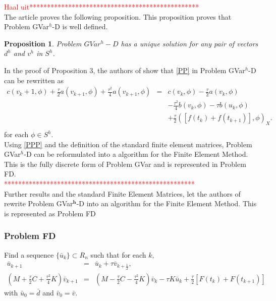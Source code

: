 \documentclass[../../main.tex]{subfiles}
\begin{document}
\textcolor{red}{Haal uit************************************************}\\
The article \cite{BV13} proves the following proposition. This proposition proves that Problem GVar$^h$-D is well defined.

\newtheorem{DC_Prop4}[DC_Prop2]{Proposition}
\begin{DC_Prop4}
	Problem $GVar^{h}-D$ has a unique solution for any pair of vectors $d^{h}$ and $v^{h}$ in $S^{h}$.
\end{DC_Prop4}

In the proof of Proposition 3, the authors of \cite{BV13} show that \eqref{PP} in Problem GVar$^h$-D can be rewritten as
\begin{eqnarray}
	c(v_k+1,\phi) + \frac{\tau}{2} a(v_{k+1},\phi) + \frac{\tau^2}{4} a(v_{k+1},\phi) & = & c(v_k,\phi) - \frac{\tau}{2} a(v_k,\phi) \nonumber \\  &&
	- \frac{\tau^2}{4}b(v_k,\phi) - \tau b(u_k,\phi) \nonumber\\
	&&+\frac{\tau}{2}([f(t_k)+f(t_{k+1})],\phi)_X.\nonumber \\ \label{PPP}
\end{eqnarray} for each $\phi \in S^h$.\\

Using \eqref{PPP} and the definition of the standard finite element matrices, Problem GVar$^h$-D can be reformulated into a algorithm for the Finite Element Method. This is the fully discrete form of Problem GVar and is represented in Problem FD.\\
\textcolor{red}{******************************************************}\\

Further results and the standard Finite Element Matrices, let the authors of \cite{BV13} rewrite Problem GVar$^\mathbf{{h}}$-D into an algorithm for the Finite Element Method. This is represented as Problem FD

\subsubsection*{Problem FD}
Find a sequence $\{\bar{u}_{k}\}\subset R_{n}$ such that for each $k,$
\begin{eqnarray*}
	\bar{u}_{k+1}\ & = & \bar{u}_{k}+\tau\bar{v}_{k+\frac{1}{2}},\\
	(M + \frac{\tau}{2}C+\frac{\tau^{2}}{4}K)\bar{v}_{k+1} & = & (M- \frac{\tau}{2}C-\frac{\tau^{2}}{4}K)\bar{v}_{k}-\tau K\bar{u}_{k}+\frac{\tau}{2}[F(t_{k})+F(t_{k+1})]
\end{eqnarray*}
with $\bar{u}_{0}=\bar{d}$ and $\bar{v}_{0}=\bar{v}.$\\
\end{document}
